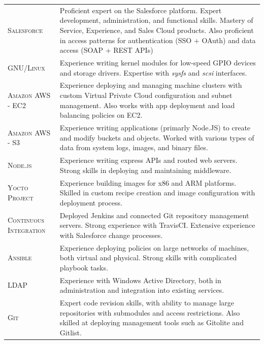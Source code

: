 \documentclass[a4paper, oneside, final]{scrartcl} %
\begin{document}
\begin{center}
\begin{tabularx}{0.97\linewidth}{>{\raggedleft\scshape}p{2cm}X}
	Salesforce& Proficient expert on the Salesforce platform. Expert development, administration, and functional skills. Mastery of Service, Experience, and Sales Cloud products. Also proficient in access patterns for authentication (SSO + OAuth) and data access (SOAP + REST APIs)\\
\arrayrulecolor{gray}\hline
	GNU/Linux& Experience writing kernel modules for low-speed GPIO devices and storage drivers. Expertise with \textit{sysfs} and \textit{scsi} interfaces. \\
\arrayrulecolor{gray}\hline
	Amazon AWS - EC2& Experience deploying and managing machine clusters with custom Virtual Private Cloud configuration and subnet management. Also works with app deployment and load balancing policies on EC2.\\
\arrayrulecolor{gray}\hline
	Amazon AWS - S3& Experience writing applications (primarly Node.JS) to create and modify buckets and objects. Worked with various types of data from system logs, images, and binary files.\\
\arrayrulecolor{gray}\hline
	Node.js& Experience writing express APIs and routed web servers. Strong skills in deploying and maintaining middleware.\\
\arrayrulecolor{gray}\hline
	Yocto Project& Experience building images for x86 and ARM platforms. Skilled in custom recipe creation and image configuration with deployment process.\\
\arrayrulecolor{gray}\hline
	Continuous Integration&Deployed Jenkins and connected Git repository management servers. Strong experience with TravisCI. Extensive experience with Salesforce change processes.\\
\arrayrulecolor{gray}\hline
	Ansible& Experience deploying policies on large networks of machines, both virtual and physical. Strong skills with complicated playbook tasks.\\
\arrayrulecolor{gray}\hline
	LDAP& Experience with Windows Active Directory, both in administration and integration into existing services.\\
\arrayrulecolor{gray}\hline
	Git& Expert code revision skills, with ability to manage large repositories with submodules and access restrictions. Also skilled at deploying management tools such as Gitolite and Gitlist.
\end{tabularx}




\end{center}
\end{document}

